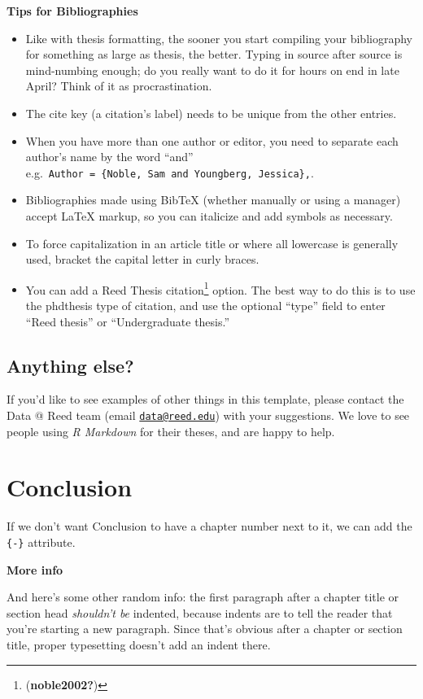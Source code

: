 \documentclass[12pt,twoside]{reedthesis}
\providecommand{\tightlist}{%
  \setlength{\itemsep}{0pt}\setlength{\parskip}{0pt}}
\begin{document}
\textbf{Tips for Bibliographies}
\begin{itemize}
\tightlist
\item
  Like with thesis formatting, the sooner you start compiling your bibliography for something as large as thesis, the better. Typing in source after source is mind-numbing enough; do you really want to do it for hours on end in late April? Think of it as procrastination.
\item
  The cite key (a citation's label) needs to be unique from the other entries.
\item
  When you have more than one author or editor, you need to separate each author's name by the word ``and'' e.g.~\texttt{Author\ =\ \{Noble,\ Sam\ and\ Youngberg,\ Jessica\},}.
\item
  Bibliographies made using BibTeX (whether manually or using a manager) accept LaTeX markup, so you can italicize and add symbols as necessary.
\item
  To force capitalization in an article title or where all lowercase is generally used, bracket the capital letter in curly braces.
\item
  You can add a Reed Thesis citation\footnote{(\textbf{noble2002?})} option. The best way to do this is to use the phdthesis type of citation, and use the optional ``type'' field to enter ``Reed thesis'' or ``Undergraduate thesis.''
\end{itemize}
\hypertarget{anything-else}{%
\section{Anything else?}\label{anything-else}}

If you'd like to see examples of other things in this template, please contact the Data @ Reed team (email \href{mailto:data@reed.edu}{\nolinkurl{data@reed.edu}}) with your suggestions. We love to see people using \emph{R Markdown} for their theses, and are happy to help.

\hypertarget{conclusion}{%
\chapter*{Conclusion}\label{conclusion}}

If we don't want Conclusion to have a chapter number next to it, we can add the \texttt{\{-\}} attribute.

\textbf{More info}

And here's some other random info: the first paragraph after a chapter title or section head \emph{shouldn't be} indented, because indents are to tell the reader that you're starting a new paragraph. Since that's obvious after a chapter or section title, proper typesetting doesn't add an indent there.
\end{document}
